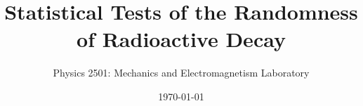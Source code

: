 \documentclass{revtex4}
\begin{document}

\title{Statistical Tests of the Randomness of Radioactive Decay}


\author{Physics 2501: Mechanics and Electromagnetism Laboratory}


\date{\today}



\setlength{\topmargin}{0in}

\maketitle

\end{document}
